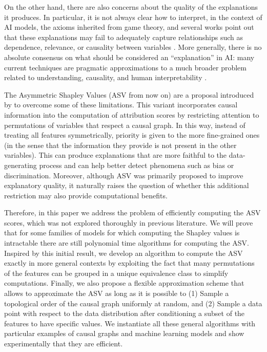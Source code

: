 On the other hand, there are also concerns about the quality of the explanations it produces. In particular, it is not always clear how to interpret, in the context of AI models, the axioms inherited from game theory, and several works point out that these explanations may fail to adequately capture relationships 
such as dependence, relevance, or causality between variables \parencite{fryer2021shapley, marques2023logic, huang2023inadequacy}. More generally, there is no absolute consensus on what should be considered an “explanation” in AI: many current techniques are pragmatic approximations to a much broader problem related to understanding, causality, and human interpretability \parencite{MILLER20191, lipton2017mythosmodelinterpretability}.

The Asymmetric Shapley Values (ASV from now on) are a proposal introduced by \cite{frye2019asymmetric} to overcome some of these limitations. This variant incorporates causal information into the computation of attribution scores by restricting attention to permutations of variables that respect a causal graph. 
In this way, instead of treating all features symmetrically, priority is given to the more fine-grained ones (in the sense that the information they provide is not present in the other variables). This can produce explanations that are more faithful to the data-generating process and can help better detect phenomena such as bias or discrimination. 
Moreover, although ASV was primarily proposed to improve explanatory quality, it naturally raises the question of whether this additional restriction may also provide computational benefits.

Therefore, in this paper we address the problem of efficiently computing the ASV scores, which was not explored thoroughly in previous literature. We will prove that for some families of models for which
computing the Shapley values is intractable there are still polynomial time algorithms for computing the ASV. Inspired by this initial result, we develop an algorithm to compute the ASV exactly in more general contexts
by exploiting the fact that many permutations of the features can be grouped in a unique equivalence class to simplify computations. Finally, we also propose a flexible approximation scheme that allows to approximate the ASV as long as it is possible to (1) Sample a topological order of the causal graph uniformly at random, and (2) Sample a data point with respect to the data distribution after conditioning a subset of the features to have specific values. We instantiate all these general algorithms with particular 
examples of causal graphs and machine learning models and show experimentally that they are efficient.
